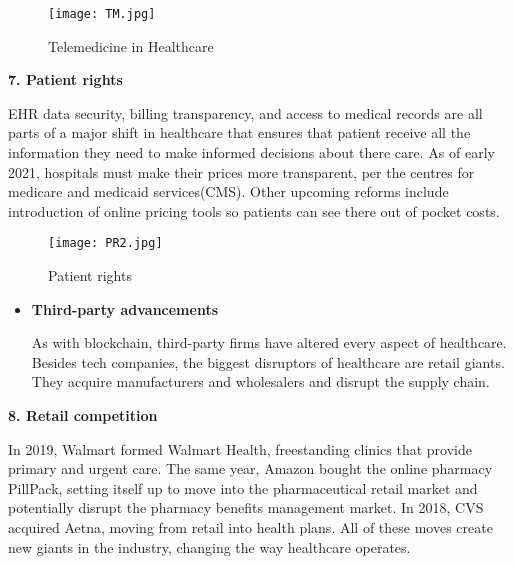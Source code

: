 \documentclass[12pt,a4paper]{article}
\begin{document}
\begin{figure}[h]
\centering
\texttt{[image: TM.jpg]}
\caption{Telemedicine in Healthcare}
\end{figure}

\clearpage

\textbf{7. Patient rights}

\hspace{1cm}

EHR data security, billing transparency, and access to medical records are all parts of a major shift in healthcare that ensures that patient receive all the information they need to make informed decisions about there care. As of early 2021, hospitals must make their prices more transparent, per the centres for medicare and medicaid services(CMS). Other upcoming reforms include introduction of online pricing tools so patients can see there out of pocket costs.

\hspace{5cm}


\begin{figure}[h]
\centering
\texttt{[image: PR2.jpg]}
\caption{Patient rights}
\end{figure}

\hspace{5cm}


\begin{itemize}

\item \textbf{Third-party advancements}

As with blockchain, third-party firms have altered every aspect of healthcare. Besides tech companies, the biggest disruptors of healthcare are retail giants. They acquire manufacturers and wholesalers and disrupt the supply chain. 
\end{itemize}

\clearpage


\textbf{8. Retail competition}

\hspace{1cm}

           
In 2019, Walmart formed Walmart Health, freestanding clinics that provide primary and urgent care. The same year, Amazon bought the online pharmacy PillPack, setting itself up to move into the pharmaceutical retail market and potentially disrupt the pharmacy benefits management market. In 2018, CVS acquired Aetna, moving from retail into health plans. All of these moves create new giants in the industry, changing the way healthcare operates. 
\end{document}
